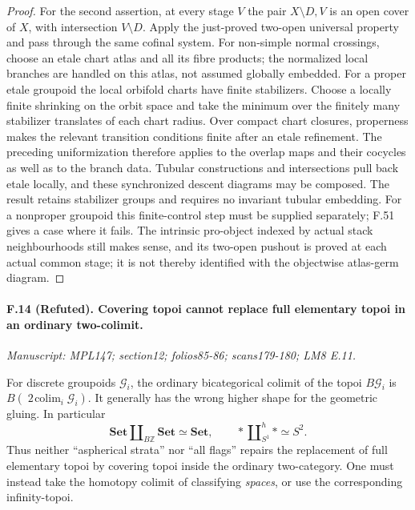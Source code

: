 \begin{proof}
For the second assertion, at every stage $V$ the pair
$X\setminus D,V$ is an open cover of $X$, with intersection
$V\setminus D$. Apply the just-proved two-open universal property and
pass through the same cofinal system. For non-simple normal crossings,
choose an etale chart atlas and all its fibre products; the normalized
local branches are handled on this atlas, not assumed globally embedded.
For a proper etale groupoid the local orbifold charts have finite
stabilizers. Choose a locally finite shrinking on the orbit space and
take the minimum over the finitely many stabilizer translates of each
chart radius. Over compact chart closures, properness makes the relevant
transition conditions finite after an etale refinement. The preceding
uniformization therefore applies to the overlap maps and their cocycles
as well as to the branch data. Tubular constructions and intersections
pull back etale locally, and these synchronized descent diagrams may be
composed. The result retains stabilizer groups and requires no invariant
tubular embedding. For a nonproper groupoid this finite-control step
must be supplied separately; F.51 gives a case where it fails. The
intrinsic pro-object indexed by actual stack neighbourhoods still makes
sense, and its two-open pushout is proved at each actual common stage;
it is not thereby identified with the objectwise atlas-germ diagram.
\end{proof}

\paragraph{F.14 (Refuted). Covering topoi cannot replace full elementary
topoi in an ordinary two-colimit.}
\textit{Manuscript: MPL147; section12; folios85-86; scans179-180; LM8 E.11.}

For discrete groupoids $\mathcal G_i$, the ordinary bicategorical colimit
of the topoi $B\mathcal G_i$ is
$B(\operatorname*{2\!colim}_i\mathcal G_i)$. It generally has the wrong
higher shape for the geometric gluing. In particular
\[
 \mathbf{Set}\amalg_{B\mathbb Z}\mathbf{Set}\simeq\mathbf{Set},
 \qquad *\amalg_{S^1}^{h}*\simeq S^2.
\]
Thus neither ``aspherical strata'' nor ``all flags'' repairs the
replacement of full elementary topoi by covering topoi inside the
ordinary two-category. One must instead take the homotopy colimit of
classifying \emph{spaces}, or use the corresponding infinity-topoi.

